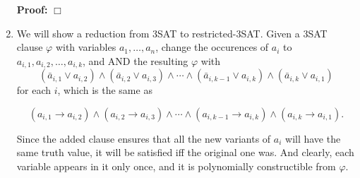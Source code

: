 \documentclass[11pt]{article} \usepackage{amssymb}
\newenvironment{proof}{\noindent \textbf{Proof:}}{$\Box$}
\renewcommand{\phi}{\varphi}
\begin{document}
\begin{enumerate}
\begin{proof}
    \end{proof}
  \item We will show a reduction from 3SAT to restricted-3SAT. Given a 3SAT
    clause $\phi$ with variables $a_1,\ldots,a_n$, change the occurences
    of $a_i$ to $a_{i,1},a_{i,2},\ldots,a_{i,k}$, and AND the resulting 
    $\phi$ with
    \begin{equation*}
    (\bar{a}_{i,1}\vee a_{i,2})\wedge(\bar{a}_{i,2}\vee a_{i,3})\wedge\cdots\wedge
(\bar{a}_{i,k-1}\vee a_{i,k})\wedge(\bar{a}_{i,k}\vee a_{i,1})  
    \end{equation*}
     for each $i$, which is the same as 

    \begin{equation*}
    (a_{i,1}\to a_{i,2})\wedge(a_{i,2}\to a_{i,3})\wedge\cdots\wedge
(a_{i,k-1}\to a_{i,k})\wedge(a_{i,k}\to a_{i,1}).
    \end{equation*}

    Since the added clause ensures that all the new variants of $a_i$ will have
    the same truth value, it will be satisfied iff the original one was. And
    clearly, each variable appears in it only once, and it is polynomially
    constructible from $\phi$.

    

\end{enumerate}
\end{document}
